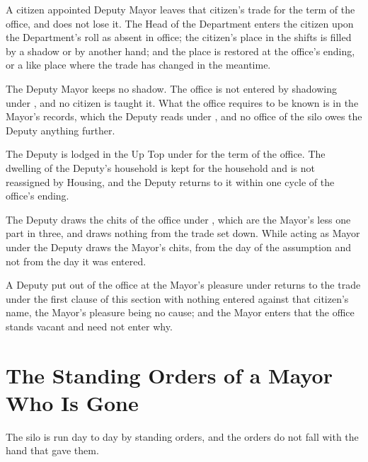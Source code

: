 \begin{clauses}
\item A citizen appointed Deputy Mayor leaves that citizen's trade for the term of the office, and does not lose it. The Head of the Department enters the citizen upon the Department's roll as absent in office; the citizen's place in the shifts is filled by a shadow or by another hand; and the place is restored at the office's ending, or a like place where the trade has changed in the meantime.
\item The Deputy Mayor keeps no shadow. The office is not entered by shadowing under , and no citizen is taught it. What the office requires to be known is in the Mayor's records, which the Deputy reads under , and no office of the silo owes the Deputy anything further.
\item The Deputy is lodged in the Up Top under  for the term of the office. The dwelling of the Deputy's household is kept for the household and is not reassigned by Housing, and the Deputy returns to it within one cycle of the office's ending.
\item The Deputy draws the chits of the office under , which are the Mayor's less one part in three, and draws nothing from the trade set down. While acting as Mayor under  the Deputy draws the Mayor's chits, from the day of the assumption and not from the day it was entered.
\item A Deputy put out of the office at the Mayor's pleasure under  returns to the trade under the first clause of this section with nothing entered against that citizen's name, the Mayor's pleasure being no cause; and the Mayor enters that the office stands vacant and need not enter why.
\end{clauses}

\section{The Standing Orders of a Mayor Who Is Gone}
\label{sec:succession:standing-orders-of-a-mayor-who-is-gone}

The silo is run day to day by standing orders, and the orders do not fall with the hand that gave them.


